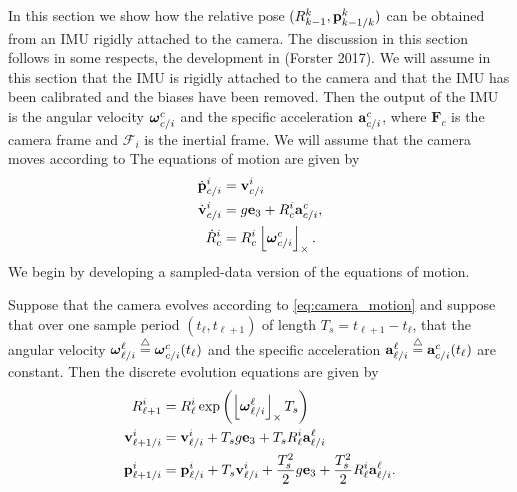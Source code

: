 In this section we show how the relative pose $(R_{k-1}^k, \mathbf{p}_{k-1/k}^k)$ can be obtained from an IMU rigidly attached to the camera.  The discussion in this section follows in some respects, the development in (Forster 2017)\cite{ForsterCarloneDellaert17}.  
We will assume in this section that the IMU is rigidly attached to the camera and that the IMU has been calibrated and the biases have been removed.  Then the output of the IMU is the 
angular velocity $\boldsymbol{\omega}_{c/i}^c$ and the specific acceleration $\mathbf{a}_{c/i}^c$, 
where $\mathbf{F}_c$ is the camera frame and $\mathcal{F}_i$ is the inertial frame. 
We will assume that the camera moves according to 
The equations of motion are given by
\begin{align}
\dot{\pbf}_{c/i}^i &= \vbf_{c/i}^i  \label{eq:camera_motion_p} \\
\dot{\vbf}_{c/i}^i &= g \ebf_3 + R_c^i\abf_{c/i}^c, \label{eq:camera_motion_v} \\
\dot{R}_c^i &= R_c^i \ss{\omegabf_{c/i}^c}. \label{eq:camera_motion_R}
\end{align}
We begin by developing a sampled-data version of the equations of motion.
\begin{lemma}
	Suppose that the camera evolves according to \eqref{eq:camera_motion} and suppose that over one sample period $(t_\ell, t_{\ell+1})$ of length $T_s=t_{\ell+1}-t_\ell$, that the angular velocity $\boldsymbol{\omega}_{\ell/i}^{\ell}\stackrel{\triangle}{=}\boldsymbol{\omega}_{c/i}^c(t_\ell)$ and the specific acceleration $\mathbf{a}_{\ell/i}^{\ell}\stackrel{\triangle}{=} \mathbf{a}_{c/i}^c(t_\ell)$ are constant.  Then the discrete evolution equations are given by
	\begin{align}
	R_{\ell+1}^i &= R_{\ell}^i \exp\left(\ss{\omegabf_{\ell/i}^{\ell}} T_s \right)
	\label{eq:R_imu_int_1} \\
	\vbf_{\ell+1/i}^{i} &= \vbf_{\ell/i}^{i} + T_s g \ebf_3 + T_s R_{\ell}^i \abf_{\ell/i}^{\ell} \label{eq:v_imu_int_1} \\
	\pbf_{\ell+1/i}^{i} &= \pbf_{\ell/i}^{i} + T_s\vbf_{\ell/i}^i + \frac{T_s^2}{2} g\ebf_3 + \frac{T_s^2}{2} R_{\ell}^i \abf_{\ell/i}^{\ell} \label{eq:p_imu_int_1}.
	\end{align}
\end{lemma}
